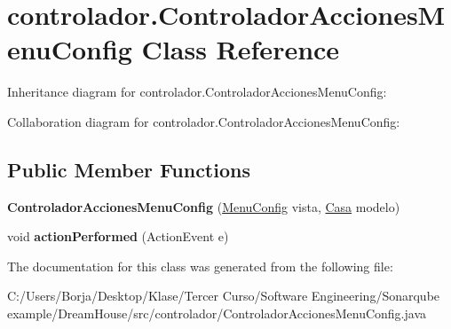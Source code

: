 \hypertarget{classcontrolador_1_1_controlador_acciones_menu_config}{}\section{controlador.\+Controlador\+Acciones\+Menu\+Config Class Reference}
\label{classcontrolador_1_1_controlador_acciones_menu_config}


Inheritance diagram for controlador.\+Controlador\+Acciones\+Menu\+Config\+:


Collaboration diagram for controlador.\+Controlador\+Acciones\+Menu\+Config\+:
\subsection*{Public Member Functions}
\begin{DoxyCompactItemize}
\item 
\mbox{\label{classcontrolador_1_1_controlador_acciones_menu_config_a4170bd70b4aec4fdb00586176b624ffe}} 
{\bfseries Controlador\+Acciones\+Menu\+Config} (\mbox{\hyperlink{classvista_1_1_menu_config}{Menu\+Config}} vista, \mbox{\hyperlink{classmodelo_1_1_casa}{Casa}} modelo)
\item 
\mbox{\label{classcontrolador_1_1_controlador_acciones_menu_config_aa3e8635c243c1d61bea4ba8ef3a20f48}} 
void {\bfseries action\+Performed} (Action\+Event e)
\end{DoxyCompactItemize}


The documentation for this class was generated from the following file\+:\begin{DoxyCompactItemize}
\item 
C\+:/\+Users/\+Borja/\+Desktop/\+Klase/\+Tercer Curso/\+Software Engineering/\+Sonarqube example/\+Dream\+House/src/controlador/Controlador\+Acciones\+Menu\+Config.\+java\end{DoxyCompactItemize}
